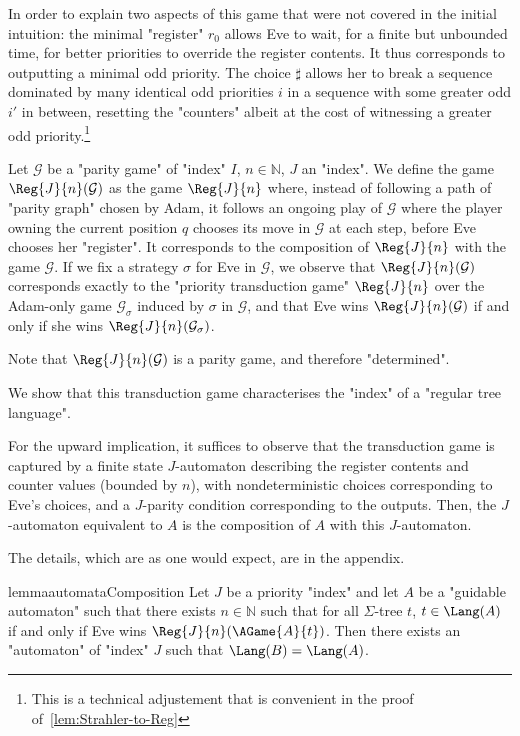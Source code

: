 \documentclass[a4paper,UKenglish,cleveref, autoref, thm-restate]{lipics-v2021}
\newif\ificalp
\newcommand{\NN}{\mathbb{N}}
\newcommand{\G}{\mathcal{G}}
\begin{document}
In order to explain two aspects of this game that were not covered in the initial intuition: the minimal "register" $r_0$ allows Eve to wait, for a finite but unbounded time, for better priorities to override the register contents. It thus corresponds to outputting a minimal odd priority.
The choice $\sharp$ allows her to break a sequence dominated by many identical odd priorities $i$ in a sequence with some greater odd $i'$ in between, resetting the "counters" albeit at the cost of witnessing a greater odd priority.\footnote{This is a technical adjustement that is convenient in the proof of~\cref{lem:Strahler-to-Reg}}

Let $\G$ be a "parity game" of "index" $I$, $n\in \NN$, $J$ an "index". We define the game $\Reg{J}{n}(\G)$ as the game $\Reg{J}{n}$ where, instead of following a path of "parity graph" chosen by Adam, it follows an ongoing play of $\G$ where the player owning the current position $q$ chooses its move in $\G$ at each step, before Eve chooses her "register". It corresponds to the composition of $\Reg{J}{n}$ with the game $\G$. If we fix a strategy $\sigma$ for Eve in $\G$, we observe that $\Reg{J}{n}(\G)$ corresponds exactly to the "priority transduction game" $\Reg{J}{n}$ over the Adam-only game $\G_\sigma$ induced by $\sigma$ in $\G$, and that Eve wins $\Reg{J}{n}(\G)$ if and only if she wins $\Reg{J}{n}(\G_\sigma)$.

Note that $\Reg{J}{n}(\G)$ is a parity game, and therefore "determined".

We show that this transduction game characterises the "index" of a "regular tree language".


\thmfeasibilitygame*



For the upward implication, it suffices to observe that the transduction game is captured by a finite state $J$-automaton describing the register contents and counter values (bounded by $n$), with nondeterministic choices corresponding to Eve's choices, and a $J$-parity condition corresponding to the outputs. Then, the $J$-automaton equivalent to $A$ is the composition of $A$ with this $J$-automaton. 
\ificalp
The details, which are as one would expect, are in the full version.
\else
The details, which are as one would expect, are in the appendix.
\fi
\begin{restatable}{lemma}{automataComposition}\label{lem:automata-composition}
	Let $J$ be a priority "index" and let $A$ be a "guidable automaton" such that there exists $n\in \NN$ such that for all $\Sigma$-tree $t$, $t\in \Lang(A)$ if and only if Eve wins $\Reg{J}{n}(\AGame{A}{t})$. Then there exists an "automaton" of "index" $J$ such that $\Lang(B)=\Lang(A)$.
\end{restatable}
\end{document}
